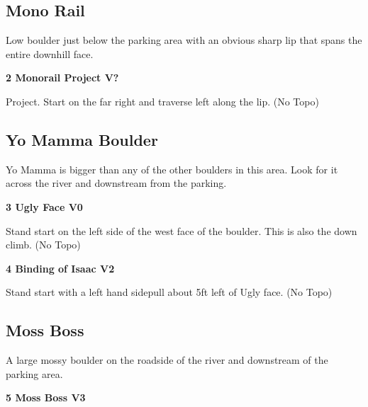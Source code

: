\begin{multicols}{2}
		\subsection*{Mono Rail}\label{bf:Mono Rail}
		Low boulder just below the parking area with an obvious sharp lip that spans the entire downhill face.\\
	
			\label{rt:Monorail Project}
\colorbox{black!20}{
\parbox{0.95\linewidth}{
\textbf{
2 Monorail Project V?  
}
}
}

			\begin{adjustwidth}{0.5cm}{}				
			Project. Start on the far right and traverse left along the lip.
				\newline (No Topo) 
			\end{adjustwidth}
		\subsection*{Yo Mamma Boulder}\label{bf:Yo Mamma Boulder}
		Yo Mamma is bigger than any of the other boulders in this area. Look for it across the river and downstream from the parking.\\
	
			\label{rt:Ugly Face}
\colorbox{green!20}{
\parbox{0.95\linewidth}{
\textbf{
3 Ugly Face V0  \warn
}
}
}

			\begin{adjustwidth}{0.5cm}{}				
			Stand start on the left side of the west face of the boulder. This is also the down climb.
				\newline (No Topo) 
			\end{adjustwidth}
			\label{rt:Binding of Isaac}
\colorbox{green!20}{
\parbox{0.95\linewidth}{
\textbf{
4 Binding of Isaac V2  \warn
}
}
}

			\begin{adjustwidth}{0.5cm}{}				
			Stand start with a left hand sidepull about 5ft left of Ugly face.
				\newline (No Topo) 
			\end{adjustwidth}
		\subsection*{Moss Boss}\label{bf:Moss Boss}
		A large mossy boulder on the roadside of the river and downstream of the parking area.\\
	
			\label{rt:Moss Boss}
\colorbox{green!20}{
\parbox{0.95\linewidth}{
\textbf{
5 Moss Boss V3  
}
}
}


\end{multicols}
